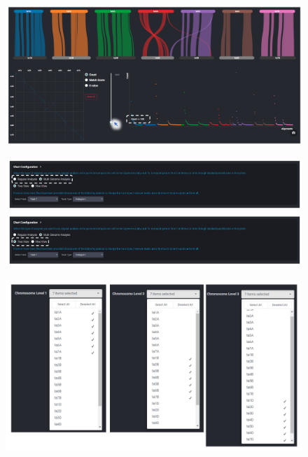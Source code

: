 \documentclass{uofsthesis-cs}
\begin{document}
\begin{appendices}
\begin{figure}[h]
      \includegraphics[width=\textwidth]{images/appendix/step_7.PNG}
\end{figure}

\begin{figure}[h]
      \includegraphics[width=\textwidth]{images/appendix/step_8.PNG}
\end{figure}

\begin{figure}[h]
      \includegraphics[width=\textwidth]{images/appendix/step_9.PNG}
\end{figure}


\end{appendices}
\end{document}

